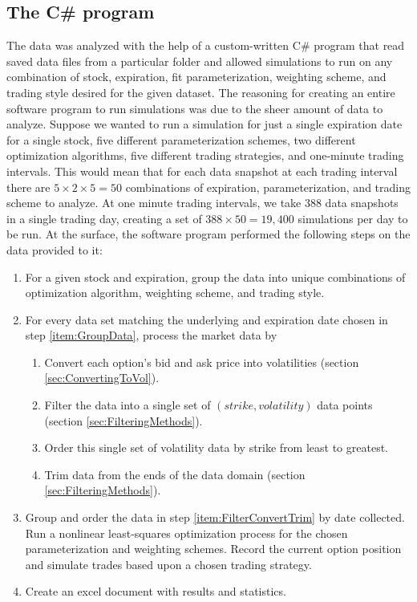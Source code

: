 \documentclass[12pt, a4paper, notitlepage]{article}
\numberwithin{equation}{subsection}
\numberwithin{figure}{subsection}
\numberwithin{table}{subsection}
\newcommand{\newpar}{\newline \newline}
\begin{document}
\subsection{The C\# program}
The data was analyzed with the help of a custom-written C\# program that read saved data files from a particular folder and allowed simulations to run on any combination of stock, expiration, fit parameterization, weighting scheme, and trading style desired for the given dataset.
\newpar
The reasoning for creating an entire software program to run simulations was due to the sheer amount of data to analyze.  Suppose we wanted to run a simulation for just a single expiration date for a single stock, five different parameterization schemes, two different optimization algorithms, five different trading strategies, and one-minute trading intervals.  This would mean that for each data snapshot at each trading interval there are $5 \times 2 \times 5 = 50$ combinations of expiration, parameterization, and trading scheme to analyze.  At one minute trading intervals, we take 388 data snapshots in a single trading day, creating a set of $388 \times 50 = 19,400$ simulations per day to be run.
\newpar
At the surface, the software program performed the following steps on the data provided to it:
\begin{enumerate}
	\item For a given stock and expiration, group the data into unique combinations of optimization algorithm, weighting scheme, and trading style.\label{item:GroupData}
    \item For every data set matching the underlying and expiration date chosen in step \ref{item:GroupData}, process the market data by
    \begin{enumerate}
    	 \item Convert each option's bid and ask price into volatilities (section \ref{sec:ConvertingToVol}).
         \item Filter the data into a single set of $(strike, volatility)$ data points (section \ref{sec:FilteringMethods}).
         \item Order this single set of volatility data by strike from least to greatest.
         \item Trim data from the ends of the data domain (section \ref{sec:FilteringMethods}).\label{item:FilterConvertTrim}
    \end{enumerate}
	\item Group and order the data in step \ref{item:FilterConvertTrim} by date collected.  Run a nonlinear least-squares optimization process for the chosen parameterization and weighting schemes.  Record the current option position and simulate trades based upon a chosen trading strategy.
   \item Create an excel document with results and statistics.
\end{enumerate}
\end{document}
